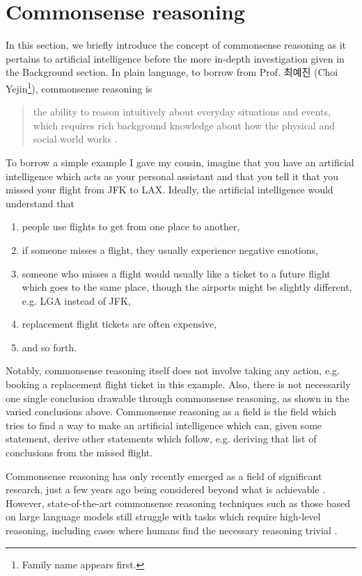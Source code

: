 \documentclass[12pt]{report}
\begin{document}
\section{Commonsense reasoning}
In this section, we briefly introduce the concept of commonsense reasoning as it pertains to artificial intelligence before the more in-depth investigation given in the Background section.
In plain language, to borrow from Prof. 최예진 (Choi Yejin\footnote{Family name appears first.}), commonsense reasoning is
\begin{quote}
    the ability to reason intuitively about everyday situations and events, which requires rich background knowledge about how  the physical and social world works \cite{Choi2022-to}.
\end{quote}
To borrow a simple example I gave my cousin, imagine that you have an artificial intelligence which acts as your personal assistant and that you tell it that you missed your flight from JFK to LAX.
Ideally, the artificial intelligence would understand that
\begin{enumerate}[nolistsep]
    \item people use flights to get from one place to another,
    \item if someone misses a flight, they usually experience negative emotions,
    \item someone who misses a flight would usually like a ticket to a future flight which goes to the same place, though the airports might be slightly different, e.g. LGA instead of JFK,
    \item replacement flight tickets are often expensive,
    \item and so forth.
\end{enumerate}
Notably, commonsense reasoning itself does not involve taking any action, e.g. booking a replacement flight ticket in this example.
Also, there is not necessarily one single conclusion drawable through commonsense reasoning, as shown in the varied conclusions above.
Commonsense reasoning as a field is the field which tries to find a way to make an artificial intelligence which can, given some statement, derive other statements which follow, e.g. deriving that list of conclusions from the missed flight.

Commonsense reasoning has only recently emerged as a field of significant research, just a few years ago being considered beyond what is achievable \cite{Choi2022-to}.
However, state-of-the-art commonsense reasoning techniques such as those based on large language models still struggle with tasks which require high-level reasoning, including cases where humans find the necessary reasoning trivial \cite{Richardson2023-mq}.
\end{document}
